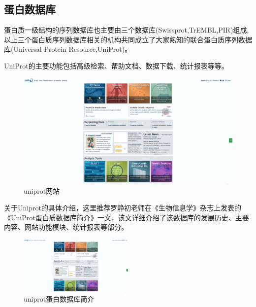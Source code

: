 \subsection {蛋白数据库}
蛋白质一级结构的序列数据库也主要由三个数据库(Swissprot,TrEMBL,PIR)组成,以上三个蛋白质序列数据库相关的机构共同成立了大家熟知的联合蛋白质序列数据库(Universal Protein Resource,UniProt)。

UniProt的主要功能包括高级检索、帮助文档、数据下载、统计报表等等。

\begin{figure}[htbp]
    \centering
    \includegraphics[width=1.0\textwidth]{image/Alignment/uniprot.png}
    \caption{uniprot网站}
\end{figure}

关于Uniprot的具体介绍，这里推荐罗静初老师在《生物信息学》杂志上发表的《UniProt蛋白质数据库简介》一文，该文详细介绍了该数据库的发展历史、主要内容、网站功能模块、统计报表等部分。

\begin{figure}[htbp]
    \centering
    \includegraphics[width=0.5\textwidth]{image/Alignment/uniprot.png}
    \caption{uniprot蛋白数据库简介}
\end{figure}